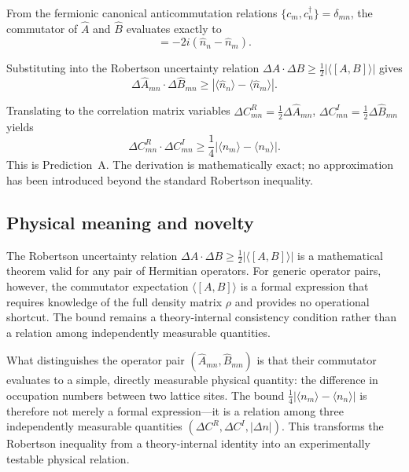 \documentclass[aps,pra,preprint,groupedaddress,amsmath,amssymb,floatfix]{revtex4-2}
\begin{document}
From the fermionic canonical anticommutation relations $\{c_m, c^\dagger_n\} = \delta_{mn}$, the commutator of $\hat{A}$ and $\hat{B}$ evaluates exactly to
\begin{equation}
[\hat{A}_{mn}, \hat{B}_{mn}] = -2i(\hat{n}_n - \hat{n}_m).
\end{equation}

Substituting into the Robertson uncertainty relation $\Delta A \cdot \Delta B \ge \frac{1}{2} |\langle [A,B] \rangle|$ gives
\begin{equation}
\Delta \hat{A}_{mn} \cdot \Delta \hat{B}_{mn} \ge |\langle \hat{n}_n \rangle - \langle \hat{n}_m \rangle|.
\end{equation}

Translating to the correlation matrix variables $\Delta C^R_{mn} = \frac{1}{2} \Delta \hat{A}_{mn}$, $\Delta C^I_{mn} = \frac{1}{2} \Delta \hat{B}_{mn}$ yields
\begin{equation}
\boxed{\Delta C^R_{mn} \cdot \Delta C^I_{mn} \ge \frac{1}{4} \bigl| \langle n_m \rangle - \langle n_n \rangle \bigr|}. \label{eq:predA}
\end{equation}
This is Prediction~A. The derivation is mathematically exact; no approximation has been introduced beyond the standard Robertson inequality.

\subsection{Physical meaning and novelty}

The Robertson uncertainty relation $\Delta A \cdot \Delta B \ge \frac{1}{2} |\langle [A,B] \rangle|$ is a mathematical theorem valid for any pair of Hermitian operators. For generic operator pairs, however, the commutator expectation $\langle [A,B] \rangle$ is a formal expression that requires knowledge of the full density matrix $\rho$ and provides no operational shortcut. The bound remains a theory-internal consistency condition rather than a relation among independently measurable quantities.

What distinguishes the operator pair $(\hat{A}_{mn}, \hat{B}_{mn})$ is that their commutator evaluates to a simple, directly measurable physical quantity: the difference in occupation numbers between two lattice sites. The bound $\frac{1}{4} |\langle n_m \rangle - \langle n_n \rangle|$ is therefore not merely a formal expression---it is a relation among three independently measurable quantities $(\Delta C^R, \Delta C^I, |\Delta n|)$. This transforms the Robertson inequality from a theory-internal identity into an experimentally testable physical relation.
\end{document}
